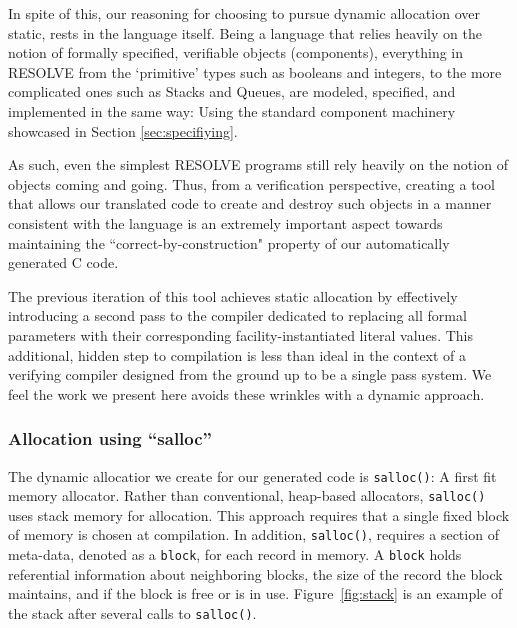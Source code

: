 
In spite of this, our reasoning for choosing to pursue dynamic allocation over static, rests in the language itself. Being a language that relies heavily on the notion of formally specified, verifiable objects (components), everything in RESOLVE from the `primitive' types such as booleans and integers, to the more complicated ones such as Stacks and Queues, are modeled, specified, and implemented in the same way: Using the standard component machinery showcased in Section \ref{sec:specifiying}. 

As such, even the simplest RESOLVE programs still rely heavily on the notion of objects coming and going. Thus, from a verification perspective, creating a tool that allows our translated code to create and destroy such objects in a manner consistent with the language is an extremely important aspect towards maintaining the ``correct-by-construction" property of our automatically generated C code.

The previous iteration of this tool \cite{regula:2010} achieves static allocation by effectively introducing a second pass to the compiler dedicated to replacing all formal parameters with their corresponding facility-instantiated literal values. This additional, hidden step to compilation is less than ideal in the context of a verifying compiler designed from the ground up to be a single pass system. We feel the work we present here avoids these wrinkles with a dynamic approach.

\subsubsection{Allocation using ``salloc''}

The dynamic allocatior we create for our generated code is \texttt{salloc()}: A first fit memory allocator. Rather than conventional, heap-based allocators, \texttt{salloc()} uses stack memory for allocation. This approach requires that a single fixed block of memory is chosen at compilation. In addition, \texttt{salloc()}, requires a section of meta-data, denoted as a \texttt{block}, for each record in memory. A \texttt{block} holds referential information about neighboring blocks, the size of the record the block maintains, and if the block is free or is in use. Figure~\ref{fig:stack} is an example of the stack after several calls to \texttt{salloc()}.

